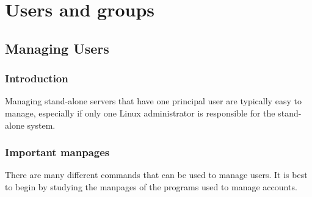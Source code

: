 \chapter{Users and groups}
\label{ch:usersgroups}
\pagestyle{fancy}

\fancyhf{} %
\fancyhead[OC]{\leftmark} %
\setlength{\headheight}{13.99pt} 
\cfoot{\thepage} %
\section{Managing Users}
\subsection{Introduction}
Managing stand-alone servers that have one principal user are typically easy to manage, especially if only one Linux administrator is responsible for the stand-alone system.

\subsection{Important manpages}
There are many different commands that can be used to manage users. It is best to begin by studying the manpages of the programs used to manage accounts.

